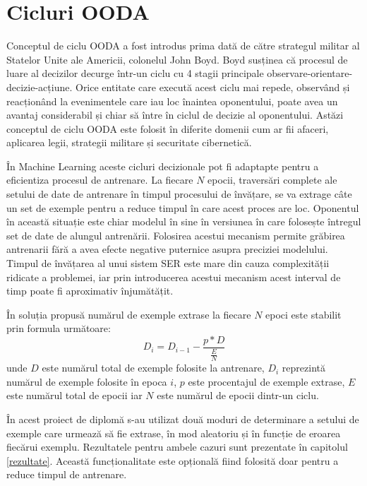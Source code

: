 \documentclass[a4paper,12pt]{book}
\begin{document}
				\section{Cicluri OODA} \label{ooda}
				 Conceptul de ciclu OODA a fost introdus prima dată de către strategul militar al Statelor Unite ale Americii, colonelul John Boyd. Boyd susținea că procesul de luare al decizilor decurge într-un ciclu cu 4 stagii principale observare-orientare-decizie-acțiune. Orice entitate care execută acest ciclu mai repede, observând și reacționând la evenimentele care iau loc înaintea oponentului, poate avea un avantaj considerabil și chiar să între în ciclul de decizie al oponentului. Astăzi conceptul de ciclu OODA este folosit în diferite domenii cum ar fii afaceri, aplicarea legii, strategii militare și securitate cibernetică. \par
				 
				 În Machine Learning aceste cicluri decizionale pot fi adaptapte pentru a eficientiza procesul de antrenare. La fiecare $N$ epocii, traversări complete ale setului de date de antrenare în timpul procesului de învățare, se va extrage câte un set de exemple pentru a reduce timpul în care acest proces are loc. Oponentul în această situație este chiar modelul în sine în versiunea în care folosește întregul set de date de alungul antrenării.  Folosirea acestui mecanism permite grăbirea antrenarii fără a avea efecte negative puternice asupra preciziei modelului. Timpul de învățarea al unui sistem SER este mare din cauza complexității ridicate a problemei, iar prin introducerea acestui mecanism acest interval de timp poate fi aproximativ înjumătățit. \par
				 
				 În soluția propusă numărul de exemple extrase la fiecare $N$ epoci este stabilit prin formula următoare:
				 \begin{equation}
				 	D_i = D_{i-1} - \frac{p * D}{\frac{E}{N}}
				 \end{equation}
				  unde $D$ este numărul total de exemple folosite la antrenare, $D_i$ reprezintă numărul de exemple folosite în epoca $i$, $p$ este procentajul de exemple extrase, $E$ este numărul total de epocii iar $N$ este numărul de epocii dintr-un ciclu. \par
				 În acest proiect de diplomă s-au utilizat două moduri de determinare a setului de exemple care urmează să fie extrase, în mod aleatoriu și în funcție de eroarea fiecărui exemplu. Rezultatele pentru ambele cazuri sunt prezentate în capitolul \ref{rezultate}. Această funcționalitate este opțională fiind folosită doar pentru a reduce timpul de antrenare.
\end{document}
